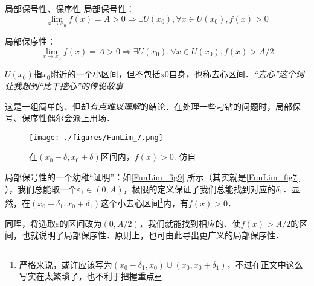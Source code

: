 \begin{theorem}{局部保号性、保序性}
局部保号性：
$$\lim_{x\to x_0}f(x)=A>0\Rightarrow \exists U(x_0), \forall x \in U(x_0), f(x)>0$$

局部保序性：
$$\lim_{x\to x_0}f(x)=A>0 \Rightarrow \exists U(x_0), \forall x \in U(x_0), f(x)>A/2$$

$U(x_0)$指$x_0$附近的一个小区间，但不包括x0自身，也称去心区间．\textsl{“去心”这个词让我想到“比干挖心”的传说故事}

这是一组简单的、但却\textsl{有点难以理解}的结论．在处理一些刁钻的问题时，局部保号、保序性偶尔会派上用场．

\begin{figure}[ht]
\centering
\texttt{[image: ./figures/FunLim\_7.png]}
\caption{在$(x_0-\delta, x_0+\delta)$区间内，$f(x)>0$. 仿自\cite{Thomas}} \label{FunLim_fig9}
\end{figure}
局部保号性的一个幼稚“证明”：如\autoref{FunLim_fig9} 所示（其实就是\autoref{FunLim_fig7} ），我们总能取一个$\varepsilon_1 \in (0,A)$，极限的定义保证了我们总能找到对应的$\delta_1$．显然，在$(x_0-\delta_1, x_0+\delta_1)$这个小去心区间\footnote{严格来说，或许应该写为$(x_0-\delta_1,x_0)\cup(x_0, x_0+\delta_1)$，不过在正文中这么写实在太繁琐了，也不利于把握重点}内，有$f(x)>0$．

同理，将选取$\varepsilon$的区间改为$(0,A/2)$，我们就能找到相应的、使$f(x)>A/2$的区间，也就说明了局部保序性．原则上，也可由此导出更广义的局部保序性．

\end{theorem}